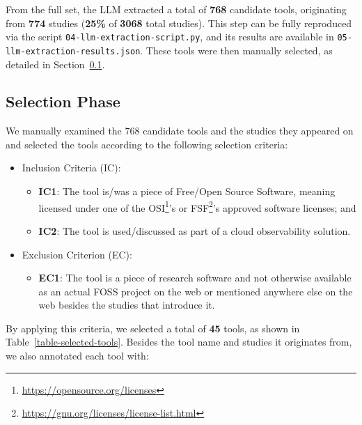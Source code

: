 \documentclass[sigconf]{acmart}
\begin{document}
From the full set, the LLM extracted a total of \textbf{768} candidate
tools, originating from \textbf{774} studies (\textbf{25\%} of
\textbf{3068} total studies). This step can be fully reproduced via the
script \texttt{04-\allowbreak llm-\allowbreak extraction-\allowbreak script.\allowbreak py}, and its results are
available in \texttt{05-\allowbreak llm-\allowbreak extraction-\allowbreak results.\allowbreak json}. These tools were
then manually selected, as detailed in
Section~\ref{selection-phase}.

\subsection{Selection Phase}\label{selection-phase}

We manually examined the 768 candidate tools and the studies they
appeared on and selected the tools according to the following selection
criteria:

\begin{itemize}
\item
  Inclusion Criteria (IC):

  \begin{itemize}
  \item
    \textbf{IC1}: The tool is/was a piece of Free/Open Source Software,
    meaning licensed under one of the OSI\footnote{\url{https://opensource.org/licenses}}'s
    or FSF\footnote{\url{https://gnu.org/licenses/license-list.html}}'s
    approved software licenses; and
  \item
    \textbf{IC2}: The tool is used/discussed as part of a cloud
    observability solution.
  \end{itemize}
\item
  Exclusion Criterion (EC):

  \begin{itemize}
  \item
    \textbf{EC1}: The tool is a piece of research software and not
    otherwise available as an actual FOSS project on the web or
    mentioned anywhere else on the web besides the studies that
    introduce it.
  \end{itemize}
\end{itemize}

By applying this criteria, we selected a total of \textbf{45} tools, as shown in Table~\ref{table-selected-tools}. Besides the
tool name and studies it originates from, we also annotated each tool with:
\end{document}
